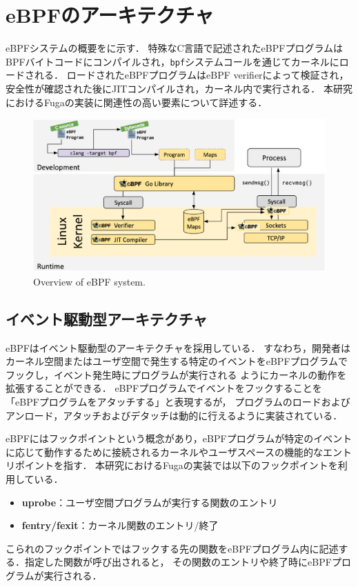 \section{eBPFのアーキテクチャ}
eBPFシステムの概要をに示す．
特殊なC言語で記述されたeBPFプログラムはBPFバイトコードにコンパイルされ，\texttt{bpf}システムコールを通じてカーネルにロードされる．
ロードされたeBPFプログラムはeBPF verifierによって検証され，安全性が確認された後にJITコンパイルされ，カーネル内で実行される．
本研究におけるFugaの実装に関連性の高い要素について詳述する．
\begin{figure}[t]
  \begin{center}
    \includegraphics[width=0.8\columnwidth]{doc/img/ebpf-overview.eps}
  \end{center}
  \caption{Overview of eBPF system. \cite{WhatiseB81:online}}
  \label{fig:ebpf-overview}
\end{figure}

\subsection{イベント駆動型アーキテクチャ}
eBPFはイベント駆動型のアーキテクチャを採用している．
すなわち，開発者はカーネル空間またはユーザ空間で発生する特定のイベントをeBPFプログラムでフックし，イベント発生時にプログラムが実行される
ようにカーネルの動作を拡張することができる．
eBPFプログラムでイベントをフックすることを「eBPFプログラムをアタッチする」と表現するが，
プログラムのロードおよびアンロード，アタッチおよびデタッチは動的に行えるように実装されている．

eBPFにはフックポイントという概念があり，eBPFプログラムが特定のイベントに応じて動作するために接続されるカーネルやユーザスペースの機能的なエントリポイントを指す．
本研究におけるFugaの実装では以下のフックポイントを利用している．
\begin{itemize}
  \item \textbf{uprobe}：ユーザ空間プログラムが実行する関数のエントリ
  \item \textbf{fentry/fexit}：カーネル関数のエントリ/終了
\end{itemize}
こられのフックポイントではフックする先の関数をeBPFプログラム内に記述する．指定した関数が呼び出されると，
その関数のエントリや終了時にeBPFプログラムが実行される．

